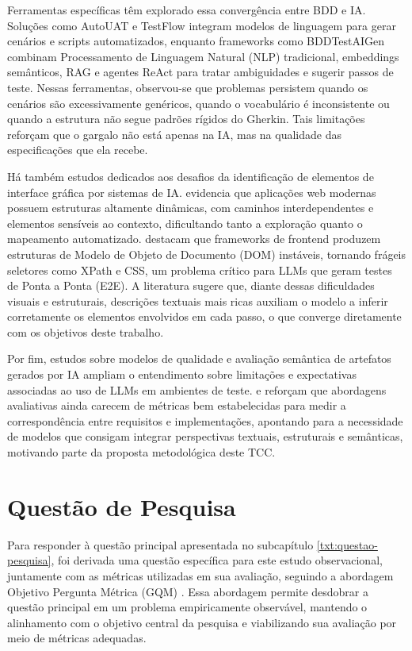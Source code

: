 Ferramentas específicas têm explorado essa convergência entre BDD e IA. Soluções como AutoUAT e TestFlow \cite{Ferreira2025} integram modelos de linguagem para gerar cenários e scripts automatizados, enquanto frameworks como BDDTestAIGen \cite{Paduraru2025} combinam Processamento de Linguagem Natural (NLP) tradicional, embeddings semânticos, RAG e agentes ReAct para tratar ambiguidades e sugerir passos de teste. Nessas ferramentas, observou-se que problemas persistem quando os cenários são excessivamente genéricos, quando o vocabulário é inconsistente ou quando a estrutura não segue padrões rígidos do Gherkin. Tais limitações reforçam que o gargalo não está apenas na IA, mas na qualidade das especificações que ela recebe.

Há também estudos dedicados aos desafios da identificação de elementos de interface gráfica por sistemas de IA.  evidencia que aplicações web modernas possuem estruturas altamente dinâmicas, com caminhos interdependentes e elementos sensíveis ao contexto, dificultando tanto a exploração quanto o mapeamento automatizado.  destacam que frameworks de frontend produzem estruturas de Modelo de Objeto de Documento (DOM) instáveis, tornando frágeis seletores como XPath e CSS, um problema crítico para LLMs que geram testes de Ponta a Ponta (E2E). A literatura sugere que, diante dessas dificuldades visuais e estruturais, descrições textuais mais ricas auxiliam o modelo a inferir corretamente os elementos envolvidos em cada passo, o que converge diretamente com os objetivos deste trabalho.

Por fim, estudos sobre modelos de qualidade e avaliação semântica de artefatos gerados por IA ampliam o entendimento sobre limitações e expectativas associadas ao uso de LLMs em ambientes de teste.  e  reforçam que abordagens avaliativas ainda carecem de métricas bem estabelecidas para medir a correspondência entre requisitos e implementações, apontando para a necessidade de modelos que consigam integrar perspectivas textuais, estruturais e semânticas, motivando parte da proposta metodológica deste TCC.

\section{Questão de Pesquisa}
\label{sec:questao-pesquisa}

Para responder à questão principal apresentada no subcapítulo \ref{txt:questao-pesquisa}, foi derivada uma questão específica para este estudo observacional, juntamente com as métricas utilizadas em sua avaliação, seguindo a abordagem Objetivo Pergunta Métrica (GQM) . Essa abordagem permite desdobrar a questão principal em um problema empiricamente observável, mantendo o alinhamento com o objetivo central da pesquisa e viabilizando sua avaliação por meio de métricas adequadas.

